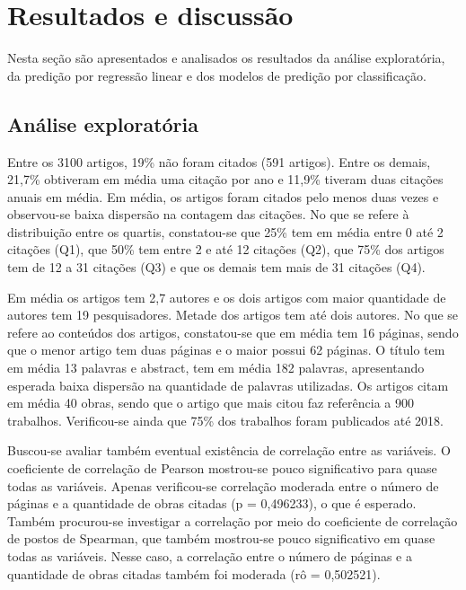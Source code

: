 \documentclass[runningheads]{llncs}
\begin{document}
\section{Resultados e discussão}

Nesta seção são apresentados e analisados os resultados da análise exploratória, da predição por regressão linear e dos modelos de predição por classificação.

\subsection{Análise exploratória}

Entre os 3100 artigos, 19\% não foram citados (591 artigos). Entre os demais, 21,7\% obtiveram em média uma citação por ano e 11,9\% tiveram duas citações anuais em média. Em média, os artigos foram citados pelo menos duas vezes e observou-se baixa dispersão na contagem das citações. No que se refere à distribuição entre os quartis, constatou-se que 25\% tem em média entre 0 até 2 citações (Q1), que 50\% tem entre 2 e até 12 citações (Q2), que 75\% dos artigos tem de 12 a 31 citações (Q3) e que os demais tem mais de 31 citações (Q4).

Em média os artigos tem 2,7 autores e os dois artigos com maior quantidade de autores tem 19 pesquisadores. Metade dos artigos tem até dois autores. No que se refere ao conteúdos dos artigos, constatou-se que em média tem 16 páginas, sendo que o menor artigo tem duas páginas e o maior possui 62 páginas. O título tem em média 13 palavras e abstract, tem em média 182 palavras, apresentando esperada baixa dispersão na quantidade de palavras utilizadas. Os artigos citam em média 40 obras, sendo que o artigo que mais citou faz referência a 900 trabalhos. Verificou-se ainda que 75\% dos trabalhos foram publicados até 2018.

Buscou-se avaliar também eventual existência de correlação entre as variáveis. O coeficiente de correlação de Pearson mostrou-se pouco significativo para quase todas as variáveis. Apenas verificou-se correlação moderada entre o número de páginas e a quantidade de obras citadas (p = 0,496233), o que é esperado. Também procurou-se investigar a correlação por meio do coeficiente de correlação de postos de Spearman, que também mostrou-se pouco significativo em quase todas as variáveis. Nesse caso, a correlação entre o número de páginas e a quantidade de obras citadas também foi moderada (rô = 0,502521).
\end{document}
